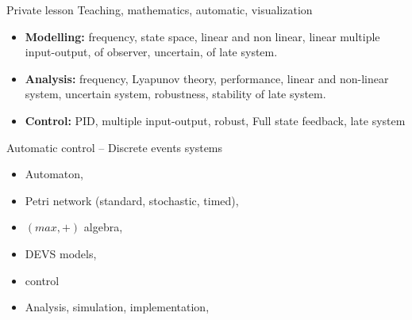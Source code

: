 \documentclass[11pt,a4paper,sans]{moderncv}        %
\newcommand{\myitem}{\textbullet}
\begin{document}
\begin{samepage}
\begin{minipage}[t]{.51\textwidth}
%
{Private lesson}%
{Teaching, mathematics, automatic, visualization}%
\end{minipage}



{%
{\begin{itemize}[label=\myitem]%
\item \textbf{Modelling: }%
 {\small frequency, state space, linear and non linear, linear multiple input-output, of observer, uncertain, of late system.}%
% 
\item \textbf{Analysis: }%
{\small frequency, Lyapunov theory, performance, linear and non-linear system, uncertain system, robustness, stability of late system.}%
\item \textbf{Control: }%
{\small PID, multiple input-output, robust, Full state feedback, late system}%
\end{itemize}}}{Automatic control -- Discrete events systems}%
{{\begin{itemize}[label=\myitem]%
		\item Automaton,%
		\item {\small Petri network (standard, stochastic, timed),}%
		\item {\small $(max,+)$ algebra,}%
		\item {\small DEVS models,}%
		\item {\small control}%
		\item {\small Analysis, simulation, implementation,}%

\end{itemize}}}
\end{samepage}
\end{document}
